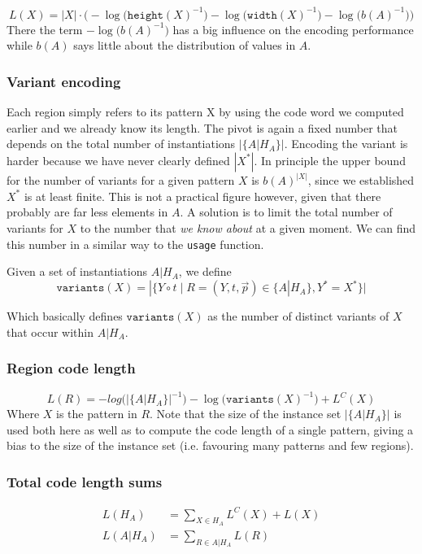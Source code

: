 \documentclass{llncs}
\begin{document}
$$
L(X)= |X| \cdot \bigg( -\log\Big(\mathtt{height}(X)^{-1}\Big) -\log\Big(\mathtt{width}(X)^{-1}\Big) - \log\Big(b(A)^{-1}\Big)\bigg)
$$
There the term $-\log\Big(b(A)^{-1}\Big)$ has a big influence on the encoding performance while $b(A)$ says little about the distribution of values in $A$.

\subsubsection{Variant encoding}

Each region simply refers to its pattern X by using the code word we computed earlier and we already know its length. The pivot is again a fixed number that depends on the total number of instantiations $|\{A|H_A\}|$. Encoding the variant is harder because we have never clearly defined $|X^*|$. In principle the upper bound for the number of variants for a given pattern $X$ is $b(A)^{|X|}$, since we established $X^*$ is at least finite. This is not a practical figure however, given that there probably are far less elements in $A$. A solution is to limit the total number of variants for $X$ to the number that \emph{we know about} at a given moment. We can find this number in a similar way to the \texttt{usage} function. 
\begin{definition}
Given a set of instantiations $A|H_A$, we define
$$\mathtt{variants}(X) = |\{Y\circ t\mid R=(Y,t,\vec{p}) \in \{A|H_A\}, Y^*=X^*\}|$$
\end{definition}
Which basically defines $\mathtt{variants}(X)$ as the number of distinct variants of $X$ that occur within $A|H_A$. 

\subsubsection{Region code length}

$$
L(R) = -log\big(|\{A|H_A\}|^{-1}\big) -\log\big(\mathtt{variants}(X)^{-1}\big) + L^C(X)
$$
Where $X$ is the pattern in $R$. Note that the size of the instance set $|\{A|H_A\}|$ is used both here as well as to compute the code length of a single pattern, giving a bias to the size of the instance set (i.e. favouring many patterns and few regions).

\subsubsection{Total code length sums}

\begin{align*}
L(H_A) &= \displaystyle\sum_{X\in H_A} L^C(X) + L(X) \\
L(A|H_A) &= \displaystyle\sum_{R\in A|H_A} L(R)
\end{align*}
\end{document}
